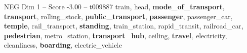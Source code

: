 \begin{textsample}{NEG Dim 1 – Score -3.00 – t009887}  \label{ex:f1_neg_032}
train, head, \textbf{mode\_of\_transport}, \textbf{transport}, rolling\_stock, \textbf{public\_transport}, \textbf{passenger}, passenger\_car, \textbf{temple}, rail\_transport, \textbf{standing}, train\_station, rapid\_transit, railroad\_car, \textbf{pedestrian}, metro\_station, \textbf{transport\_hub}, ceiling, \textbf{travel}, electricity, cleanliness, \textbf{boarding}, electric\_vehicle

\end{textsample}
